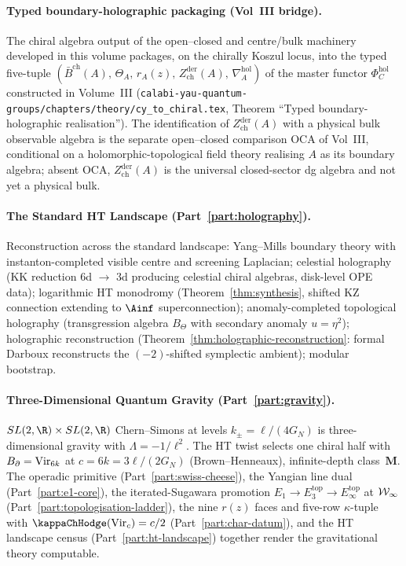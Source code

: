 \paragraph{Typed boundary-holographic packaging (Vol~III bridge).}
The chiral algebra output of the open--closed and centre/bulk machinery
developed in this volume packages, on the chirally Koszul locus, into
the typed five-tuple
$(\bar B^{\mathrm{ch}}(A),\, \Theta_A,\, r_A(z),\, Z^{\mathrm{der}}_{\mathrm{ch}}(A),\, \nabla_A^{\mathrm{hol}})$
of the master functor $\Phi^{\mathrm{hol}}_C$ constructed in Volume~III
(\texttt{calabi-yau-quantum-groups/chapters/theory/cy\_to\_chiral.tex},
Theorem ``Typed boundary-holographic realisation''). The identification
of $Z^{\mathrm{der}}_{\mathrm{ch}}(A)$ with a physical bulk observable
algebra is the separate open--closed comparison $\mathrm{OCA}$ of
Vol~III, conditional on a holomorphic-topological field theory realising
$A$ as its boundary algebra; absent $\mathrm{OCA}$,
$Z^{\mathrm{der}}_{\mathrm{ch}}(A)$ is the universal closed-sector dg
algebra and not yet a physical bulk.

\paragraph{The Standard HT Landscape
(Part~\ref{part:holography}).}
Reconstruction across the standard landscape: Yang--Mills
boundary theory with instanton-completed visible centre and
screening Laplacian; celestial holography (KK reduction
$6$d $\to$ $3$d producing celestial chiral algebras, disk-level
OPE data); logarithmic HT monodromy
(Theorem~\ref{thm:synthesis}, shifted KZ connection extending to
$\Ainf$ superconnection); anomaly-completed topological
holography (transgression algebra $B_\Theta$ with secondary
anomaly $u = \eta^2$); holographic reconstruction
(Theorem~\ref{thm:holographic-reconstruction}: formal Darboux
reconstructs the $(-2)$-shifted symplectic ambient); modular
bootstrap.

\paragraph{Three-Dimensional Quantum Gravity
(Part~\ref{part:gravity}).}
$SL(2,\R) \times SL(2,\R)$ Chern--Simons at levels
$k_\pm = \ell/(4G_N)$ is three-dimensional gravity with
$\Lambda = -1/\ell^2$. The HT twist selects one chiral half
with $B_{\partial} = \mathrm{Vir}_{6k}$ at $c = 6k = 3\ell/(2G_N)$
(Brown--Henneaux), infinite-depth class~$\mathbf{M}$. The
operadic primitive (Part~\ref{part:swiss-cheese}), the Yangian
line dual (Part~\ref{part:e1-core}), the iterated-Sugawara
promotion $E_1 \to E_3^{\mathrm{top}} \to E_\infty^{\mathrm{top}}$
at $\mathcal{W}_\infty$ (Part~\ref{part:topologisation-ladder}), the
nine $r(z)$ faces and five-row $\kappa$-tuple with
$\kappaChHodge(\mathrm{Vir}_c) = c/2$
(Part~\ref{part:char-datum}), and the HT landscape census
(Part~\ref{part:ht-landscape}) together render the gravitational
theory computable.

